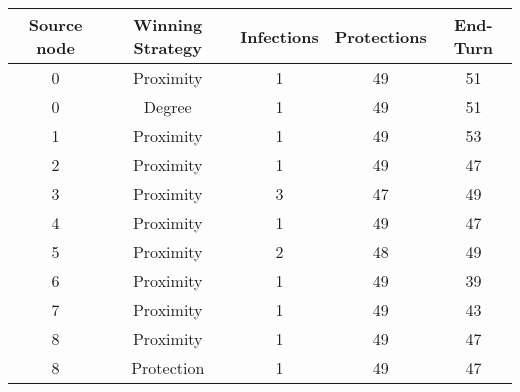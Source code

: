 \documentclass[results.tex]{subfiles}
\begin{document}
    \begin{center}
        \begin{tabular}{| c || c | c | c | c |}
            \hline
            {\bfseries Source node} & {\bfseries Winning Strategy} & {\bfseries Infections} & {\bfseries Protections}
            & {\bfseries End-Turn}
            \\  %
            \hline\hline
            0                       & Proximity                    & 1                      & 49                      & 51                   \\
            \hline
            0                       & Degree                       & 1                      & 49                      & 51                   \\
            \hline
            1                       & Proximity                    & 1                      & 49                      & 53                   \\
            \hline
            2                       & Proximity                    & 1                      & 49                      & 47                   \\
            \hline
            3                       & Proximity                    & 3                      & 47                      & 49                   \\
            \hline
            4                       & Proximity                    & 1                      & 49                      & 47                   \\
            \hline
            5                       & Proximity                    & 2                      & 48                      & 49                   \\
            \hline
            6                       & Proximity                    & 1                      & 49                      & 39                   \\
            \hline
            7                       & Proximity                    & 1                      & 49                      & 43                   \\
            \hline
            8                       & Proximity                    & 1                      & 49                      & 47                   \\
            \hline
            8                       & Protection                   & 1                      & 49                      & 47                   \\

\end{tabular}
\end{center}
\end{document}
